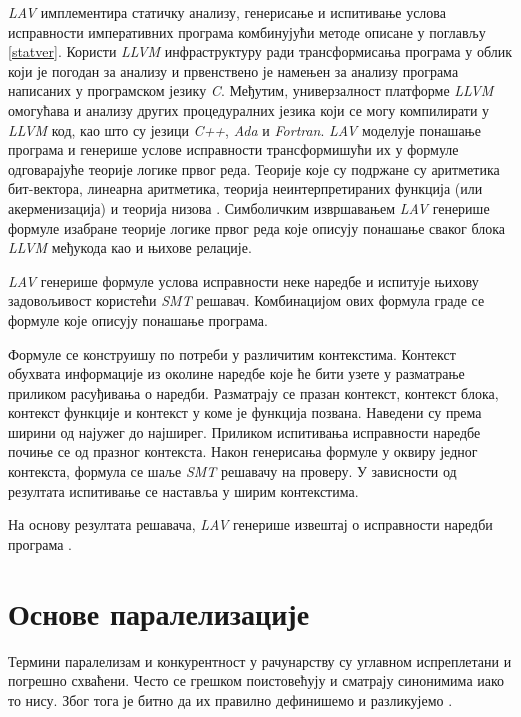 \documentclass[12pt,oneside]{memoir}
\newtheorem{definic}{Дефиниција}
\begin{document}
	\textit{LAV} имплементира статичку анализу, генерисање и испитивање услова исправности императивних програма комбинујући методе описане у поглављу \ref{statver}. Користи \textit{LLVM} инфраструктуру ради трансформисања програма у облик који је погодан за анализу и првенствено је намењен за анализу програма написаних у програмском језику \textit{C}. Међутим, универзалност платформе \textit{LLVM} омогућава и анализу других процедуралних језика који се могу компилирати у \textit{LLVM} код, као што су језици \textit{C++}, \textit{Ada} и \textit{Fortran}. \textit{LAV} моделује понашање програма и генерише услове исправности трансформишући их у формуле одговарајуће теорије логике првог реда. Теорије које су подржане су аритметика бит-вектора, линеарна аритметика, теорија неинтерпретираних функција (или акерменизација) и теорија низова \cite{smt}.  Симболичким извршавањем \textit{LAV} генерише формуле изабране теорије логике првог реда које описују понашање сваког блока \textit{LLVM} међукода као и њихове релације. 
	
	\textit{LAV} генерише формуле услова исправности неке наредбе и испитује њихову задовољивост користећи \textit{SMT} решавач. Комбинацијом ових формула граде се формуле које описују понашање програма. 
	
	 Формуле се конструишу по потреби у различитим контекстима. Контекст обухвата информације из околине наредбе које ће бити узете у разматрање приликом расуђивања о наредби. Разматрају се празан контекст, контекст блока, контекст функције и контекст у коме је функција позвана. Наведени су према ширини од најужег до најширег. Приликом испитивања исправности наредбе почиње се од празног контекста.  Након генерисања формуле у оквиру једног контекста, формула се шаље \textit{SMT} решавачу на проверу. У зависности од резултата испитивање се наставља у ширим контекстима. 
	 
 На основу резултата решавача, \textit{LAV} генерише извештај о исправности наредби програма \cite{mvjdev}. 	
	 
	
\chapter{Основе паралелизације}
	Термини паралелизам и конкурентност у рачунарству су углавном испреплетани и погрешно схваћени. Често се грешком поистовећују и сматрају синонимима иако то нису. Због тога је битно да их правилно дефинишемо и разликујемо \cite{par_computing}.
\end{document}
